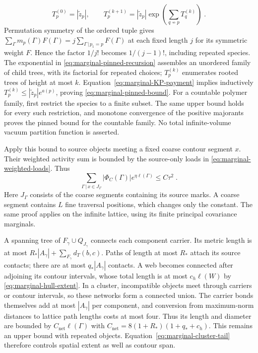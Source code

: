 \documentclass[11pt]{article}
\begin{document}
\begin{equation}\label{eq:marginal-pinned-recursion}
    T_p^{(0)}=|\widetilde z_p|,
    \qquad
    T_p^{(k+1)}=|\widetilde z_p|
        \exp\left(\sum_{q\not \sim p}T_q^{(k)}\right)\;.
\end{equation}
Permutation symmetry of the ordered tuple gives $\sum_\Gamma m_p(\Gamma)F(\Gamma)=j\sum_{\Gamma\, | \,p_1=p}F(\Gamma)$ at each fixed length $j$ for its symmetric weight $F$. Hence the factor $1/j!$ becomes $1/(j-1)!$, including repeated species. The exponential in \eqref{eq:marginal-pinned-recursion} assembles an unordered family of child trees, with its factorial for repeated choices; $T_p^{(k)}$ enumerates rooted trees of height at most $k$. Equation~\eqref{eq:marginal-KP-payment} implies inductively $T_p^{(k)}\leq |\widetilde z_p|e^{a(p)}$, proving \eqref{eq:marginal-pinned-bound}. For a countable polymer family, first restrict the species to a finite subset. The same upper bound holds for every such restriction, and monotone convergence of the positive majorants proves the pinned bound for the countable family. No total infinite-volume vacuum partition function is asserted.

Apply this bound to source objects meeting a fixed coarse contour segment $x$. Their weighted activity sum is bounded by the source-only loads in \eqref{eq:marginal-weighted-loads}. Thus
\begin{equation}\label{eq:marginal-cluster-tail}
    \sum_{\Gamma\, | \,x\in J_\Gamma}
        |\Phi_C(\Gamma)|e^{\eta\ell(\Gamma)}
        \leq C\tau^2\;.
\end{equation}
Here $J_\Gamma$ consists of the coarse segments containing its source marks. A coarse segment contains $L$ fine traversal positions, which changes only the constant. The same proof applies on the infinite lattice, using its finite principal covariance marginals.

A spanning tree of $F_\gamma\cup Q_{J_\gamma}$ connects each component carrier. Its metric length is at most $R_*|A_\gamma|+\sum_{F_\gamma}d_T(b,c)$. Paths of length at most $R_*$ attach its source contacts; there are at most $q_*|A_\gamma|$ contacts. A web becomes connected after adjoining its contour intervals, whose total length is at most $c_h\ell(W)$ by \eqref{eq:marginal-hull-extent}. In a cluster, incompatible objects meet through carriers or contour intervals, so these networks form a connected union. The carrier bonds themselves add at most $|A_\gamma|$ per component, and conversion from maximum-norm distances to lattice path lengths costs at most four. Thus its length and diameter are bounded by $C_{\mathrm{net}}\ell(\Gamma)$ with $C_{\mathrm{net}}=8(1+R_*)(1+q_*+c_h)$. This remains an upper bound with repeated objects. Equation~\eqref{eq:marginal-cluster-tail} therefore controls spatial extent as well as contour span.
\end{document}
